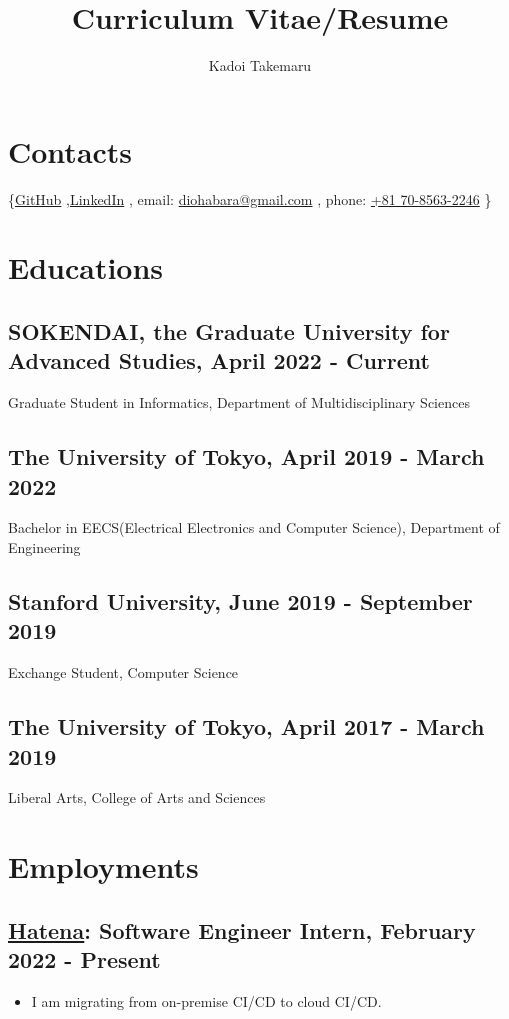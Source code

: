 \documentclass[12pt]{article}
\title{\vspace{-1cm}Curriculum Vitae/Resume}
\author{Kadoi Takemaru}
\date{}
\begin{document}

\section*{Contacts}
  \{\href{https://github.com/diohabara/}{GitHub}
    ,\href{https://www.linkedin.com/in/takemaru-kadoi-6950b5172/}{LinkedIn}
    , email: \href{mailto:diohabara@gmail.com}{diohabara@gmail.com}
    , phone: \href{tel:817085632246}{+81 70-8563-2246}
  \}

\section*{Educations}
  \subsection*{SOKENDAI, the Graduate University for Advanced Studies, April 2022 - Current}
    Graduate Student in Informatics, Department of Multidisciplinary Sciences
  \subsection*{The University of Tokyo, April 2019 - March 2022}
    Bachelor in EECS(Electrical Electronics and Computer Science), Department of Engineering
  \subsection*{Stanford University, June 2019 - September 2019}
    Exchange Student, Computer Science
  \subsection*{The University of Tokyo, April 2017 - March 2019}
    Liberal Arts, College of Arts and Sciences

\section*{Employments}
  \subsection*{\href{https://hatenacorp.jp/}{Hatena}: Software Engineer Intern, February 2022 - Present}
    \begin{itemize}
      \item I am migrating from on-premise CI/CD to cloud CI/CD.
    \end{itemize}
\end{document}
